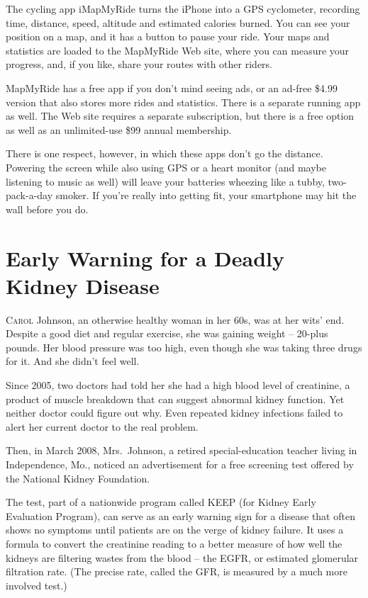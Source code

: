 ﻿\documentclass[12pt]{article}
\begin{document}
The cycling app iMapMyRide turns the iPhone into a GPS cyclometer, recording time, distance, speed,
altitude and estimated calories burned. You can see your position on a map, and it has a button to
pause your ride. Your maps and statistics are loaded to the MapMyRide Web site, where you can
measure your progress, and, if you like, share your routes with other riders.

MapMyRide has a free app if you don't mind seeing ads, or an ad-free \$4.99 version that also stores
more rides and statistics. There is a separate running app as well. The Web site requires a separate
subscription, but there is a free option as well as an unlimited-use \$99 annual membership.

There is one respect, however, in which these apps don't go the distance. Powering the screen while
also using GPS or a heart monitor (and maybe listening to music as well) will leave your batteries
wheezing like a tubby, two-pack-a-day smoker. If you're really into getting fit, your smartphone may
hit the wall before you do.

\section{Early Warning for a Deadly Kidney Disease}

\lettrine{C}{arol} Johnson, an otherwise healthy woman in her 60s, was at her wits' end. Despite a
good diet and regular exercise, she was gaining weight -- 20-plus pounds. Her blood pressure was too
high, even though she was taking three drugs for it. And she didn't feel well.

Since 2005, two doctors had told her she had a high blood level of creatinine, a product of muscle
breakdown that can suggest abnormal kidney function. Yet neither doctor could figure out why. Even
repeated kidney infections failed to alert her current doctor to the real problem.

Then, in March 2008, Mrs.~Johnson, a retired special-education teacher living in Independence, Mo.,
noticed an advertisement for a free screening test offered by the National Kidney Foundation.

The test, part of a nationwide program called KEEP (for Kidney Early Evaluation Program), can serve
as an early warning sign for a disease that often shows no symptoms until patients are on the verge
of kidney failure. It uses a formula to convert the creatinine reading to a better measure of how
well the kidneys are filtering wastes from the blood -- the EGFR, or estimated glomerular filtration
rate. (The precise rate, called the GFR, is measured by a much more involved test.)
\end{document}
